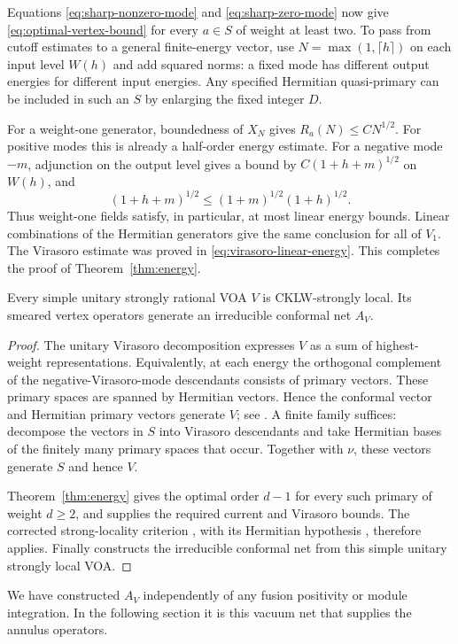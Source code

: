 Equations \eqref{eq:sharp-nonzero-mode} and
\eqref{eq:sharp-zero-mode} now give
\eqref{eq:optimal-vertex-bound} for every $a\in S$ of weight at least
two.  To pass from cutoff estimates to a general finite-energy vector,
use $N=\max(1,\lceil h\rceil)$ on each input level $W(h)$ and add
squared norms: a fixed mode has different output energies for
different input energies.  Any specified Hermitian quasi-primary can
be included in such an $S$ by enlarging the fixed integer $D$.

For a weight-one generator, boundedness of $X_N$ gives
$R_a(N)\leq CN^{1/2}$.  For positive modes this is already a
half-order energy estimate.  For a negative mode $-m$, adjunction on
the output level gives a bound by $C(1+h+m)^{1/2}$ on $W(h)$, and
\[
 (1+h+m)^{1/2}\leq(1+m)^{1/2}(1+h)^{1/2}.
\]
Thus weight-one fields satisfy, in particular, at most linear energy
bounds.  Linear combinations of the Hermitian generators give the
same conclusion for all of $V_1$.  The Virasoro estimate was proved
in \eqref{eq:virasoro-linear-energy}.  This completes the proof of
Theorem~\ref{thm:energy}.

\begin{corollary}\label{cor:locality}
Every simple unitary strongly rational VOA $V$ is CKLW-strongly local.
Its smeared vertex operators generate an irreducible conformal net
$A_V$.
\end{corollary}

\begin{proof}
The unitary Virasoro decomposition expresses $V$ as a sum of
highest-weight representations.  Equivalently, at each energy the
orthogonal complement of the negative-Virasoro-mode descendants
consists of primary vectors.  These primary spaces are spanned by
Hermitian vectors. Hence the conformal vector and Hermitian primary
vectors generate $V$; see \cite[Remark~3.9]{CTW}. A finite family
suffices: decompose the vectors in $S$ into Virasoro descendants and
take Hermitian bases of the finitely many primary spaces that occur.
Together with $\nu$, these vectors generate $S$ and hence $V$.

Theorem~\ref{thm:energy} gives the optimal order $d-1$ for every such
primary of weight $d\geq2$, and supplies the required current and
Virasoro bounds.  The corrected strong-locality criterion
\cite[Theorem~3.7]{CTW}, with its Hermitian hypothesis
\cite{CTWCorrection}, therefore applies.  Finally
\cite[Theorem~6.8]{CKLW} constructs the irreducible conformal net from
this simple unitary strongly local VOA.
\end{proof}

We have constructed $A_V$ independently of any fusion positivity or
module integration.  In the following section it is this vacuum net
that supplies the annulus operators.
